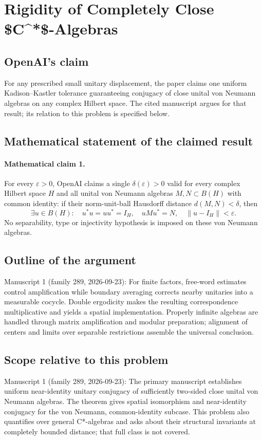 \documentclass[11pt]{article}
\begin{document}
\section*{Rigidity of Completely Close \$C\textasciicircum{}*\$-Algebras}

\subsection{OpenAI's claim}
For any prescribed small unitary displacement, the paper claims one uniform Kadison--Kastler tolerance guaranteeing conjugacy of close unital von Neumann algebras on any complex Hilbert space. The cited manuscript argues for that result; its relation to this problem is specified below.

\subsection{Mathematical statement of the claimed result}
\paragraph{Mathematical claim 1.} For every $\varepsilon>0$, OpenAI claims a single $\delta(\varepsilon)>0$ valid for every complex Hilbert space $H$ and all unital von Neumann algebras $M,N\subset B(H)$ with common identity: if their norm-unit-ball Hausdorff distance $d(M,N)<\delta$, then
\[
\exists u\in B(H):\quad u^*u=uu^*=I_H,\quad uMu^*=N,\quad\|u-I_H\|<\varepsilon.
\]
No separability, type or injectivity hypothesis is imposed on these von Neumann algebras.

\subsection{Outline of the argument}
Manuscript 1 (family 289, 2026-09-23): For finite factors, free-word estimates control amplification while boundary averaging corrects nearby unitaries into a measurable cocycle. Double ergodicity makes the resulting correspondence multiplicative and yields a spatial implementation. Properly infinite algebras are handled through matrix amplification and modular preparation; alignment of centers and limits over separable restrictions assemble the universal conclusion.

\subsection{Scope relative to this problem}
Manuscript 1 (family 289, 2026-09-23): The primary manuscript establishes uniform near-identity unitary conjugacy of sufficiently two-sided close unital von Neumann algebras. The theorem gives spatial isomorphism and near-identity conjugacy for the von Neumann, common-identity subcase. This problem also quantifies over general C*-algebras and asks about their structural invariants at completely bounded distance; that full class is not covered.
\end{document}

